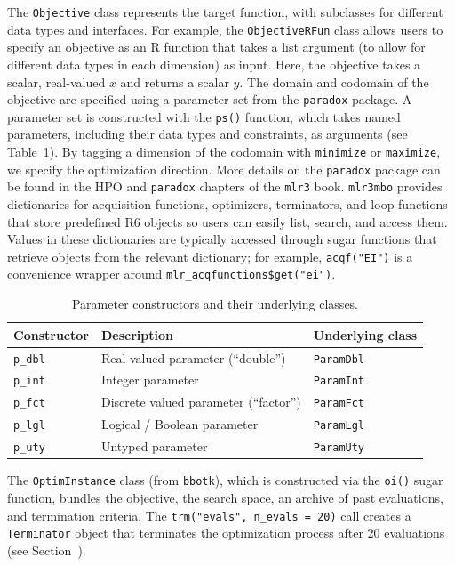 \documentclass[12pt,letterpaper]{article}
\begin{document}
The \texttt{Objective} class represents the target function, with subclasses for different data types and interfaces. 
For example, the \texttt{ObjectiveRFun} class allows users to specify an objective as an R function that takes a list argument (to allow for different data types in each dimension) as input. 
Here, the objective takes a scalar, real-valued $x$ and returns a scalar $y$.
The domain and codomain of the objective are specified using a parameter set from the \texttt{paradox} package.
A parameter set is constructed with the \texttt{ps()} function, which takes named parameters, including their data types and constraints, as arguments (see Table~\ref{tab:param-constructors}).
By tagging a dimension of the codomain with \texttt{minimize} or \texttt{maximize}, we specify the optimization direction.
More details on the \texttt{paradox} package can be found in the HPO and \texttt{paradox} chapters of the \texttt{mlr3} book\cite{becker2024}.
\texttt{mlr3mbo} provides dictionaries for acquisition functions, optimizers, terminators, and loop functions that store predefined R6 objects so users can easily list, search, and access them. 
Values in these dictionaries are typically accessed through sugar functions that retrieve objects from the relevant dictionary; for example, \texttt{acqf("EI")} is a convenience wrapper around \texttt{mlr\_acqfunctions\$get("ei")}.

\begin{table}
  \centering
  \begin{tabular}{lll}
    \toprule
    Constructor     & Description                            & Underlying class  \\
    \midrule
    \texttt{p\_dbl} & Real valued parameter (``double'')     & \texttt{ParamDbl} \\
    \texttt{p\_int} & Integer parameter                      & \texttt{ParamInt} \\
    \texttt{p\_fct} & Discrete valued parameter (``factor'') & \texttt{ParamFct} \\
    \texttt{p\_lgl} & Logical / Boolean parameter            & \texttt{ParamLgl} \\
    \texttt{p\_uty} & Untyped parameter                      & \texttt{ParamUty} \\
    \bottomrule
  \end{tabular}
  \caption{Parameter constructors and their underlying classes.}
  \label{tab:param-constructors}
\end{table}

The \texttt{OptimInstance} class (from \texttt{bbotk}), which is constructed via the \texttt{oi()} sugar function, bundles the objective, the search space, an archive of past evaluations, and termination criteria.
The \texttt{trm("evals", n\_evals = 20)} call creates a \texttt{Terminator} object that terminates the optimization process after 20 evaluations (see Section~).
\end{document}
